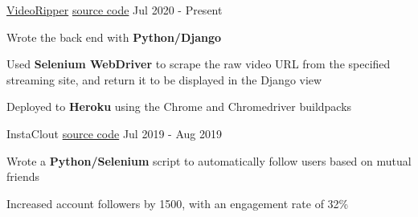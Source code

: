 \begin{cventries}
  \cventry
    {\fontsize{10pt}{1em}\bodyfont\upshape\color{text}{Fetches and plays back the raw video from a streaming site}} %
    {\href{https://videoripper.herokuapp.com/}{VideoRipper}} %
    {\href{https://github.com/tacticaltofu/videoripper}{source code}} %
    {Jul 2020 - Present} %
    {
      \begin{cvitems} %
        \item {Wrote the back end with \textbf{Python/Django}}
        \item {Used \textbf{Selenium WebDriver} to scrape the raw video URL from the specified streaming site, and return it to be displayed in the Django view}
        \item {Deployed to \textbf{Heroku} using the Chrome and Chromedriver buildpacks}
      \end{cvitems}
    }
    
  \cventry
    {\fontsize{10pt}{1em}\bodyfont\upshape\color{text}{Instagram bot for gaining real followers}} %
    {InstaClout} %
    {\href{https://github.com/tacticaltofu/InstaClout}{source code}} %
    {Jul 2019 - Aug 2019} %
    {
      \begin{cvitems} %
        \item {Wrote a \textbf{Python/Selenium} script to automatically follow users based on mutual friends}
        \item {Increased account followers by 1500, with an engagement rate of 32\%}
      \end{cvitems}
    }
\end{cventries}